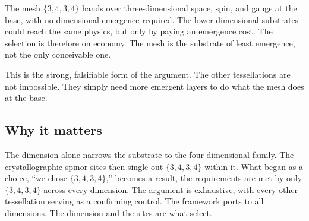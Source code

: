 \begin{principle}
The mesh $\{3,4,3,4\}$ hands over three-dimensional space, spin, and gauge at the base, with no dimensional emergence required. The lower-dimensional substrates could reach the same physics, but only by paying an emergence cost. The selection is therefore on economy. The mesh is the substrate of least emergence, not the only conceivable one.
\end{principle}

This is the strong, falsifiable form of the argument. The other tessellations are not impossible. They simply need more emergent layers to do what the mesh does at the base.

\subsection{Why it matters}

The dimension alone narrows the substrate to the four-dimensional family. The crystallographic spinor sites then single out $\{3,4,3,4\}$ within it. What began as a choice, ``we chose $\{3,4,3,4\}$,'' becomes a result, the requirements are met by only $\{3,4,3,4\}$ across every dimension. The argument is exhaustive, with every other tessellation serving as a confirming control. The framework ports to all dimensions. The dimension and the sites are what select.
